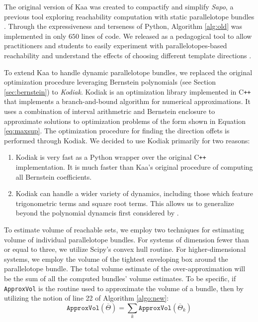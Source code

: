 The original version of Kaa was created to compactify and simplify \emph{Sapo}, a previous tool exploring reachability computation with static parallelotope bundles \cite{dreossi2017sapo}.
%
Through the expressiveness and terseness of Python, Algorithm \ref{alg:old} was implemented in only $650$ lines of code.
%
We released as a pedagogical tool to allow practitioners and students to easily experiment with parallelotopes-based reachability and understand the effects of choosing different template directions \cite{kim2020kaa}.

To extend Kaa to handle dynamic parallelotope bundles, we replaced the original optimization procedure leveraging Bernstein polynomials (see Section \ref{sec:bernstein}) to \emph{Kodiak}.
%
%
Kodiak is an optimization library implemented in C\texttt{++} that implements a branch-and-bound algorithm for numerical approximations. It uses a combination of interval arithmetric and Bernstein enclosure to approximate solutions to optimization problems of the form shown in Equation \ref{eq:maxsup}.
%
The optimization procedure for finding the direction offets is performed through Kodiak.
%
We decided to use Kodiak primarily for two reasons:
%
\begin{enumerate}
  \item Kodiak is very fast as a Python wrapper over the original C\texttt{++} implementation. It is much faster than Kaa's original procedure of computing all Bernstein coefficients.
  \item Kodiak can handle a wider variety of dynamics, including those which feature trigonometric terms and square root terms. This allows us to generalize beyond the polynomial dynamcis first considered by \cite{dreossi2016parallelotope}.
\end{enumerate}
%

To estimate volume of reachable sets, we employ two techniques for estimating volume of individual parallelotope bundles. For systems of dimension fewer than or equal to three, we utilize Scipy's convex hull routine.
%
For higher-dimensional systems, we employ the volume of the tightest enveloping box around the parallelotope bundle.
%
The total volume estimate of the over-approximation will be the sum of all the computed bundles' volume estimates.
%
To be specific, if \texttt{ApproxVol} is the routine used to approximate the volume of a bundle, then by utilizing the notion of line 22 of Algorithm \ref{algo:new}:
%
\begin{equation}
  \texttt{ApproxVol}(\overline\Theta) = \sum_{k} \texttt{ApproxVol}(\overline\Theta_k)
\end{equation}
